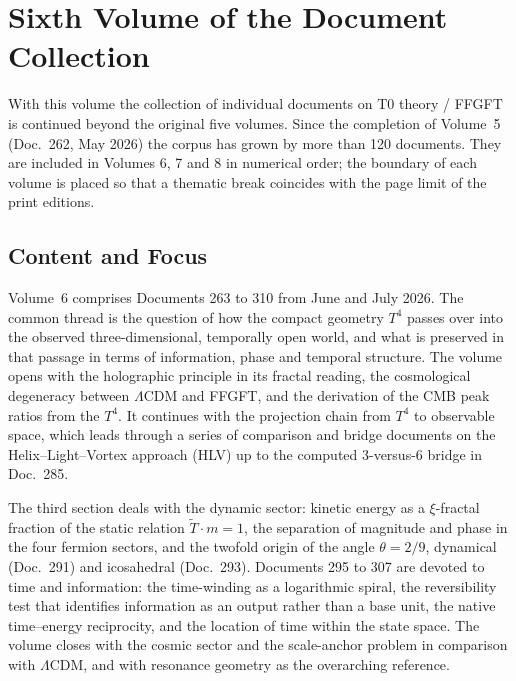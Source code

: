 
\section*{Sixth Volume of the Document Collection}

With this volume the collection of individual documents on T0 theory / FFGFT
is continued beyond the original five volumes. Since the completion of
Volume~5 (Doc.~262, May 2026) the corpus has grown by more than 120
documents. They are included in Volumes 6, 7 and 8 in numerical order; the
boundary of each volume is placed so that a thematic break coincides with the
page limit of the print editions.

\subsection*{Content and Focus}

Volume~6 comprises Documents 263 to 310 from June and July 2026. The common
thread is the question of how the compact geometry $T^4$ passes over into the
observed three-dimensional, temporally open world, and what is preserved in
that passage in terms of information, phase and temporal structure. The
volume opens with the holographic principle in its fractal reading, the
cosmological degeneracy between $\Lambda$CDM and FFGFT, and the derivation of
the CMB peak ratios from the $T^4$. It continues with the projection chain
from $T^4$ to observable space, which leads through a series of comparison and
bridge documents on the Helix--Light--Vortex approach (HLV) up to the computed
3-versus-6 bridge in Doc.~285.

The third section deals with the dynamic sector: kinetic energy as a
$\xi$-fractal fraction of the static relation $\tilde T\cdot m=1$, the
separation of magnitude and phase in the four fermion sectors, and the twofold
origin of the angle $\theta=2/9$, dynamical (Doc.~291) and icosahedral
(Doc.~293). Documents 295 to 307 are devoted to time and information: the
time-winding as a logarithmic spiral, the reversibility test that identifies
information as an output rather than a base unit, the native time--energy
reciprocity, and the location of time within the state space. The volume
closes with the cosmic sector and the scale-anchor problem in comparison with
$\Lambda$CDM, and with resonance geometry as the overarching reference.

